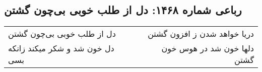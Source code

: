 \begin{center}
\section*{رباعی شماره ۱۴۶۸: دل از طلب خوبی بی‌چون گشتن}
\label{sec:1468}
\begin{longtable}{l p{0.5cm} r}
دل از طلب خوبی بی‌چون گشتن
&&
دریا خواهد شدن ز افزون گشتن
\\
دل خون شد و شکر میکند زانکه بسی
&&
دلها خون شد در هوس خون گشتن
\\
\end{longtable}
\end{center}

